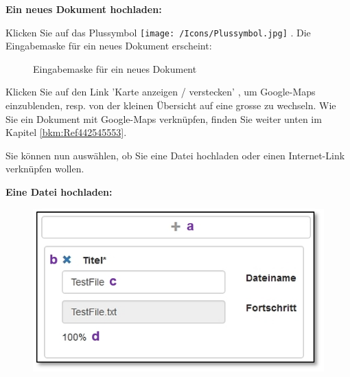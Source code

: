 \textbf{Ein neues Dokument hochladen:}

\vspace{\baselineskip}

Klicken Sie auf das Plussymbol \texttt{[image: /Icons/Plussymbol.jpg]} . Die Eingabemaske für ein neues Dokument erscheint:

\begin{figure}[H]
\caption{Eingabemaske für ein neues Dokument}
\end{figure}

Klicken Sie auf den Link 'Karte anzeigen / verstecken' , um Google-Maps einzublenden, resp. von der kleinen Übersicht auf eine grosse zu wechseln. Wie Sie ein Dokument mit Google-Maps verknüpfen, finden Sie weiter unten im Kapitel \ref{bkm:Ref442545553}. \newline

Sie können nun auswählen, ob Sie eine Datei hochladen  oder einen Internet-Link verknüpfen  wollen.

\pagebreak

\textbf{Eine Datei  hochladen:}

\begin{figure}   
  \vspace{-30pt}     
  \begin{center}
    \includegraphics[width=1\linewidth]{../chapters/11_Dokumentenablage/pictures/11-2-2_Dateititel.jpg}
  \end{center}
  \vspace{-20pt}
  \vspace{-10pt}
\end{figure}

